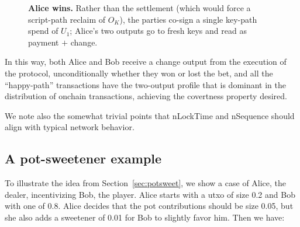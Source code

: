 \documentclass[11pt]{article}
\begin{document}
\begin{figure}[h]
\centering
{}
\caption{\textbf{Alice wins.} Rather than the settlement (which would force a script-path reclaim of $O_K$), the parties co-sign a single key-path spend of $U_1$; Alice's two outputs go to fresh keys and read as payment $+$ change.}
\label{fig:alicewins}
\end{figure}

In this way, both Alice and Bob receive a change output from the execution of the protocol, unconditionally whether they won or lost the bet, and all the ``happy-path'' transactions have the two-output profile that is dominant in the distribution of onchain transactions, achieving the covertness property desired.

We note also the somewhat trivial points that nLockTime and nSequence should align with typical network behavior.

\subsection{A pot-sweetener example}
\label{sec:sweetener}

To illustrate the idea from Section~\ref{sec:potsweet}, we show a case of Alice, the dealer, incentivizing Bob, the player. Alice starts with a utxo of size 0.2 and Bob with one of 0.8. Alice decides that the pot contributions should be size 0.05, but she also adds a sweetener of 0.01 for Bob to slightly favor him. Then we have:
\end{document}
